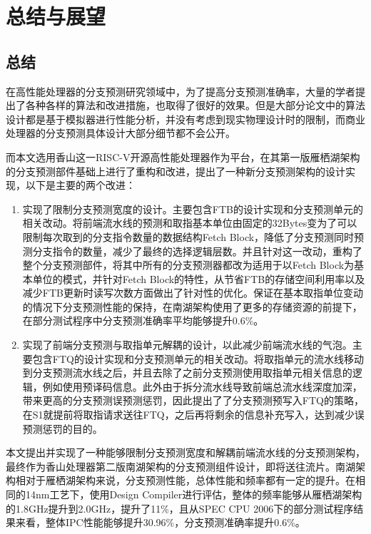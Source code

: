 
\chapter{总结与展望}

\section{总结}

在高性能处理器的分支预测研究领域中，为了提高分支预测准确率，大量的学者提出了各种各样的算法和改进措施，也取得了很好的效果。但是大部分论文中的算法设计都是基于模拟器进行性能分析，并没有考虑到现实物理设计时的限制，而商业处理器的分支预测具体设计大部分细节都不会公开。

而本文选用香山这一RISC-V开源高性能处理器作为平台，在其第一版雁栖湖架构的分支预测部件基础上进行了重构和改进，提出了一种新分支预测架构的设计实现，以下是主要的两个改进：

\begin{enumerate}
    \item 实现了限制分支预测宽度的设计。主要包含FTB的设计实现和分支预测单元的相关改动。将前端流水线的预测和取指基本单位由固定的32Bytes变为了可以限制每次取到的分支指令数量的数据结构Fetch Block，降低了分支预测同时预测分支指令的数量，减少了最终的选择逻辑层数。并且针对这一改动，重构了整个分支预测部件，将其中所有的分支预测器都改为适用于以Fetch Block为基本单位的模式，并针对Fetch Block的特性，从节省FTB的存储空间利用率以及减少FTB更新时读写次数方面做出了针对性的优化。保证在基本取指单位变动的情况下分支预测性能的保持，在南湖架构使用了更多的存储资源的前提下，在部分测试程序中分支预测准确率平均能够提升0.6\%。
    \item 实现了前端分支预测与取指单元解耦的设计，以此减少前端流水线的气泡。主要包含FTQ的设计实现和分支预测单元的相关改动。将取指单元的流水线移动到分支预测流水线之后，并且去除了之前分支预测使用取指单元相关信息的逻辑，例如使用预译码信息。此外由于拆分流水线导致前端总流水线深度加深，带来更高的分支预测误预测惩罚，因此提出了了分支预测预写入FTQ的策略，在S1就提前将取指请求送往FTQ，之后再将剩余的信息补充写入，达到减少误预测惩罚的目的。
\end{enumerate}

本文提出并实现了一种能够限制分支预测宽度和解耦前端流水线的分支预测架构，最终作为香山处理器第二版南湖架构的分支预测组件设计，即将送往流片。南湖架构相对于雁栖湖架构来说，分支预测性能，总体性能和频率都有一定的提升。在相同的14nm工艺下，使用Design Compiler进行评估，整体的频率能够从雁栖湖架构的1.8GHz提升到2.0GHz，提升了11\%，且从SPEC CPU 2006下的部分测试程序结果来看，整体IPC性能能够提升30.96\%，分支预测准确率提升0.6\%。

